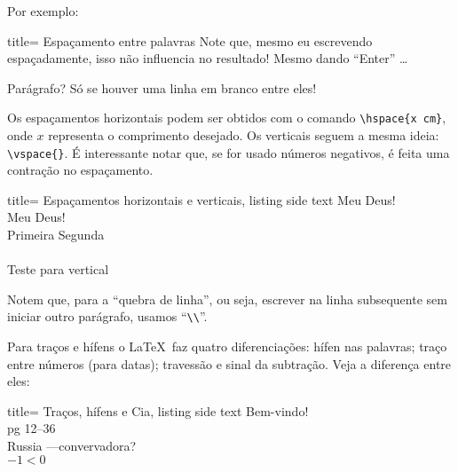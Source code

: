 Por exemplo:

\begin{tcblisting}{title= Espaçamento entre palavras}
  Note         que, mesmo        eu    escrevendo
  espaçadamente, isso não    influencia no
  resultado!
  Mesmo dando ``Enter'' \ldots
  
  Parágrafo? Só se houver uma linha em branco entre eles!
\end{tcblisting}

Os espaçamentos \textsf{horizontais} podem ser obtidos com o comando 
\Verb|\hspace{x cm}|, onde $x$ representa o comprimento desejado.
Os \textsf{verticais} seguem a mesma ideia: \Verb|\vspace{}|.
É interessante notar que, se for usado números negativos, é feita uma contração 
no espaçamento. 

\begin{tcblisting}{title= Espaçamentos horizontais e verticais, listing side text}
Meu \hspace{2cm} Deus!\\
Meu \hspace{-0.5cm} Deus!\\
Primeira \hfill Segunda\\
\vspace*{0.7cm}\\
Teste para vertical
\end{tcblisting}  

Notem que, para a ``quebra de linha'', ou seja, escrever na linha subsequente sem
iniciar outro parágrafo, usamos ``\Verb|\\|''.

Para traços e hífens o \LaTeX\ faz quatro diferenciações: hífen nas palavras;
traço entre números (para datas); travessão e sinal da subtração.
Veja a diferença entre eles:

\begin{tcblisting}{title= {Traços, hífens e Cia}, listing side text}
Bem-vindo!\\
pg 12--36\\
Russia ---convervadora?\\
$-1 < 0$  
\end{tcblisting}

